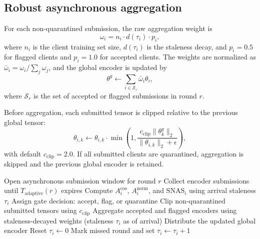 \documentclass[pdflatex,sn-mathphys-num]{sn-jnl}
\begin{document}
\subsection{Robust asynchronous aggregation}\label{sec:agg}

For each non-quarantined submission, the raw aggregation weight is
\begin{equation}
    \omega_i = n_i \cdot d(\tau_i)\cdot p_i,
\end{equation}
where $n_i$ is the client training set size, $d(\tau_i)$ is the staleness decay, and $p_i=0.5$ for flagged clients and $p_i=1.0$ for accepted clients. The weights are normalized as $\bar{\omega}_i = \omega_i/\sum_j\omega_j$, and the global encoder is updated by
\begin{equation}
    \theta^g \leftarrow \sum_{i\in\mathcal{S}_r}\bar{\omega}_i\theta_i,
\end{equation}
where $\mathcal{S}_r$ is the set of accepted or flagged submissions in round $r$.

Before aggregation, each submitted tensor is clipped relative to the previous global tensor:
\begin{equation}
    \theta_{i,k}\leftarrow \theta_{i,k}\cdot \min\left(1,\frac{c_{\mathrm{clip}}\|\theta^g_k\|_2}{\|\theta_{i,k}\|_2+\epsilon}\right),
\end{equation}
with default $c_{\mathrm{clip}}=2.0$. If all submitted clients are quarantined, aggregation is skipped and the previous global encoder is retained.

\begin{algorithm}[htbp]
\caption{SENTINEL-SplitFed server round}
\label{alg:server}
\begin{algorithmic}[1]
\State Open asynchronous submission window for round $r$
\State Collect encoder submissions until $T_{\mathrm{adaptive}}(r)$ expires
        \State Compute $A^{\mathrm{cos}}_i$, $A^{\mathrm{norm}}_i$, and $\mathrm{SNAS}_i$ using arrival staleness $\tau_i$
        \State Assign gate decision: accept, flag, or quarantine
    \EndIf
\EndFor
\State Clip non-quarantined submitted tensors using $c_{\mathrm{clip}}$
\State Aggregate accepted and flagged encoders using staleness-decayed weights (staleness $\tau_i$ as of arrival)
\State Distribute the updated global encoder
        \State Reset $\tau_i\leftarrow0$
    \Else
        \State Mark missed round and set $\tau_i\leftarrow \tau_i+1$
    \EndIf
\EndFor
\end{algorithmic}
\end{algorithm}
\end{document}
